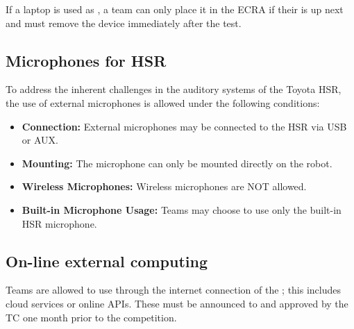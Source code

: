 If a laptop is used as \ExternalComputing, a team can only place it in the ECRA if their \Testslot{} is up next and must remove the device immediately after the test.


\subsection{Microphones for HSR}
\label{rule:microphones_hsr}

To address the inherent challenges in the auditory systems of the Toyota HSR, the use of external microphones is allowed under the following conditions:
\begin{itemize}
    \item \textbf{Connection:} External microphones may be connected to the HSR via USB or AUX.
    \item \textbf{Mounting:} The microphone can only be mounted directly on the robot.
    \item \textbf{Wireless Microphones:} Wireless microphones are NOT allowed.
    \item \textbf{Built-in Microphone Usage:} Teams may choose to use only the built-in HSR microphone.
\end{itemize}

\subsection{On-line external computing}
\label{rule:robot_external_computing_online}

Teams are allowed to use \ExternalComputing{} through the internet connection of the \ArenaNetwork{}; this includes cloud services or online APIs.
These must be announced to and approved by the TC one month prior to the competition.

